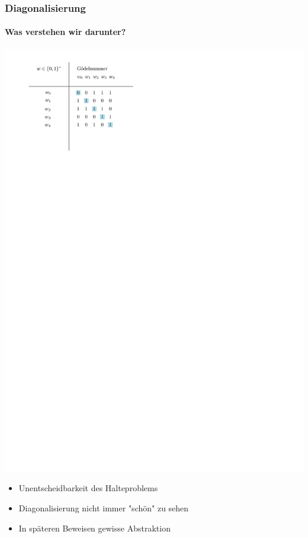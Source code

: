 \begin{frame}
	\frametitle{Diagonalisierung}
	\framesubtitle{Was verstehen wir darunter?}
	
	
	

			\includegraphics[scale = 0.6]{images/Halteproblem.pdf}%
				\begin{itemize}[<+->]
					\item Unentscheidbarkeit des Halteproblems
					\item Diagonalisierung nicht immer "schön" zu sehen
					\item In späteren Beweisen gewisse Abstraktion
				\end{itemize}
		
	
\end{frame}
